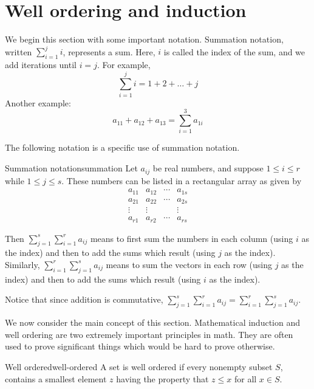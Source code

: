 \section{Well ordering and induction}

\label{well-ordering-section}

We begin this section with some important notation. Summation notation, written $\sum_{i=1}^{j} i$, represents a sum. Here, $i$ is called the index of the sum, and we add iterations until $i=j$. For example,
\[
\sum_{i=1}^{j} i = 1 + 2 + \ldots + j
\]
Another example:
\[
a_{11} + a_{12} + a_{13}  = \sum_{i=1}^{3} a_{1i}
\]

The following notation is a specific use of summation notation.

\begin{notation}{Summation notation}{summation}
Let $a_{ij}$ be real numbers, and suppose  $1\leq i\leq r$ while $
1\leq j\leq s$. These numbers can be listed in a rectangular array as given by
\begin{equation*}
\begin{array}{cccc}
a_{11} & a_{12} & \cdots & a_{1s} \\
a_{21} & a_{22} & \cdots & a_{2s} \\
\vdots & \vdots &  & \vdots \\
a_{r1} & a_{r2} & \cdots & a_{rs}
\end{array}
\end{equation*}

Then $\sum_{j=1}^{s}\sum_{i=1}^{r} a_{ij}$ means to first sum the numbers
in each column (using $i$ as the index) and then to add the sums which result (using $j$ as the index). Similarly,
$\sum_{i=1}^{r}\sum_{j=1}^{s} a_{ij}$ means to sum the vectors in
each row (using $j$ as the index) and then to add the sums which result (using $i$ as the index).
\end{notation}

Notice that since addition is commutative, $\sum_{j=1}^{s}\sum_{i=1}^{r} a_{ij} = \sum_{i=1}^{r}\sum_{j=1}^{s} a_{ij}$.

We now consider the main concept of this section. Mathematical induction and well ordering are two extremely important
principles in math. They are often used to prove significant things which
would be hard to prove otherwise.

\begin{definition}{Well ordered}{well-ordered}
 A set is well ordered if every nonempty subset $S$, contains a
smallest element $z$ having the property that $z\leq x$ for all $x\in S$.
\end{definition}

